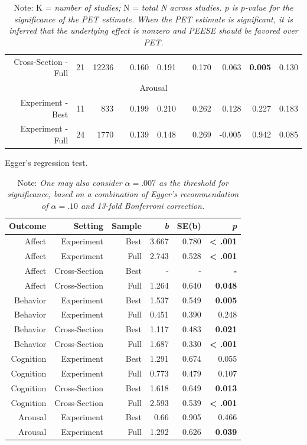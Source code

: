 \documentclass[man]{apa6}
\begin{document}
\begin{table}[htbp]
\begin{tabular}{rrrrrrrrrrr}
		Cross-Section - Full & 21    & 12236 &       & 0.160 & 0.191 &       & 0.170 & 0.063 & \textbf{0.005} & 0.130 \\
		\multicolumn{11}{c}{Arousal} \\
		Experiment - Best & 11    & 833   &       & 0.199 & 0.210 &       & 0.262 & 0.128 & 0.227 & 0.183 \\
		Experiment - Full & 24    & 1770  &       & 0.139 & 0.148 &       & 0.269 & -0.005 & 0.942 & 0.085 \\
		\bottomrule
	\end{tabular}
	\label{table:adjustment}
	\caption*{Note: K = {\em number of studies;} N = {\em total N across studies. $p$ is $p$-value for the significance of the PET estimate. When the PET estimate is significant, it is inferred that the underlying effect is nonzero and PEESE should be favored over PET.}}
\end{table}

\begin{table}[htbp]
	\centering
	\caption{Egger's regression test.}
	\begin{tabular}{rrrrrr}
		\toprule
		Outcome & Setting & Sample & \textit{b} & SE(b) & \textit{p} \\
		\midrule
		Affect & Experiment & Best  & 3.667 & 0.780 & \textbf{< .001} \\
		Affect & Experiment & Full  & 2.743 & 0.528 & \textbf{< .001} \\
		Affect & Cross-Section & Best  & -     & -     & \textbf{-} \\
		Affect & Cross-Section & Full  & 1.264 & 0.640 & \textbf{0.048} \\
		Behavior & Experiment & Best  & 1.537 & 0.549 & \textbf{0.005} \\
		Behavior & Experiment & Full  & 0.451 & 0.390 & 0.248 \\
		Behavior & Cross-Section & Best  & 1.117 & 0.483 & \textbf{0.021} \\
		Behavior & Cross-Section & Full  & 1.687 & 0.330 & \textbf{< .001} \\
		Cognition & Experiment & Best  & 1.291 & 0.674 & 0.055 \\
		Cognition & Experiment & Full  & 0.773 & 0.479 & 0.107 \\
		Cognition & Cross-Section & Best  & 1.618 & 0.649 & \textbf{0.013} \\
		Cognition & Cross-Section & Full  & 2.593 & 0.539 & \textbf{< .001} \\
		Arousal & Experiment & Best  & 0.66  & 0.905 & 0.466 \\
		Arousal & Experiment & Full  & 1.292 & 0.626 & \textbf{0.039} \\
		\bottomrule
	\end{tabular}%
	\label{table:Egger}%
	\caption*{Note: {\em One may also consider $\alpha = .007$ as the threshold for significance, based on a combination of Egger's recommendation of $\alpha = .10$ and 13-fold Bonferroni correction.}}
\end{table}
\end{document}
